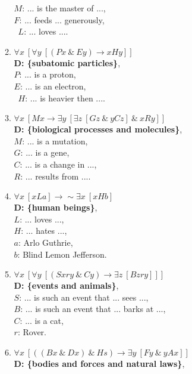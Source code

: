 \documentclass[a4paper,12pt]{article}
\newcommand{\ra}{\rightarrow}
\newcommand{\s}{\sim}
\newcommand{\ta}{ \ \& \ }
\newcommand{\all}{\forall}
\newcommand{\ex}{\exists}
\begin{document}
\begin{enumerate}[label=\arabic*,leftmargin=*]
\begin{enumerate}[label=(\roman*)]
                    $M$: ... is the master of ...,\\
                    $F$: ... feeds ... generously,\\\
                    $L$: ... loves ....
                \item $\all x \ [\all y \ [(Px \ta Ey) \ra xHy]]$\\
                    \textbf{D: \{subatomic particles\}},\\
                    $P$: ... is a proton,\\
                    $E$: ... is an electron,\\\
                    $H$: ... is heavier then ....
                \item $\all x \ [Mx \ra \ex y \ [\ex z \ [Gz \ta yCz] \ta xRy]]$\\
                    \textbf{D: \{biological processes and molecules\}},\\
                    $M$: ... is a mutation,\\
                    $G$: ... is a gene,\\
                    $C$: ... is a change in ...,\\
                    $R$: ... results from ....
                \item $\all x \ [xLa] \ra \s \ex x \ [xHb]$\\
                    \textbf{D: \{human beings\}},\\
                    $L$: ... loves ...,\\
                    $H$: ... hates ...,\\
                    $a$: Arlo Guthrie,\\
                    $b$: Blind Lemon Jefferson.
                \item $\all x \ [\all y \ [(Sxry \ta Cy) \ra \ex z \ [Bzry]]]$\\
                    \textbf{D: \{events and animals\}},\\
                    $S$: ... is such an event that ... sees ...,\\
                    $B$: ... is such an event that ... barks at ...,\\
                    $C$: ... is a cat,\\
                    $r$: Rover.
                \item $\all x \ [((Bx \ta Dx) \ta Hs) \ra \ex y \ [Fy \ta yAx]]$\\
                    \textbf{D: \{bodies and forces and natural laws\}},\\

\end{enumerate}
\end{enumerate}
\end{document}
